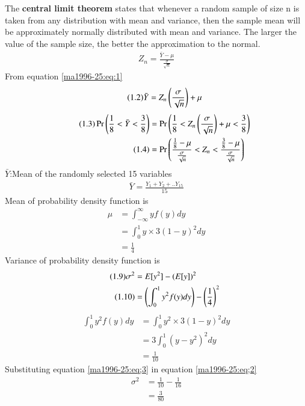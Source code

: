
The \textbf{central limit theorem} states that whenever a random sample of size n is taken from any distribution with mean and variance, then the sample mean will be approximately normally distributed with mean and variance. The larger the value of the sample size, the better the approximation to the normal.
\begin{align}
\tag{1.1}
    Z_{n}=\frac{\bar{Y}-\mu}{\frac{\sigma}{\sqrt{n}}}
    \label{ma1996-25:eq:1}
\end{align}
From equation \ref{ma1996-25:eq:1}
\begin{align}
    \tag{1.2}
    \bar{Y}=Z_{n}\left(\frac{\sigma}{\sqrt{n}}\right)+\mu
\end{align}
\begin{align}
\tag{1.3}
\Pr\left(\frac{1}{8}<\Bar{Y}<\frac{3}{8}\right)
&=\Pr\left(\frac{1}{8}<Z_{n}\left(\frac{\sigma}{\sqrt{n}}\right)+\mu<\frac{3}{8}\right)\\
\tag{1.4}  
&=\Pr\left(\frac{\frac{1}{8}-\mu}{\frac{\sigma}{\sqrt{n}}}<Z_{n}<\frac{\frac{3}{8}-\mu}{\frac{\sigma}{\sqrt{n}}}\right)
\label{ma1996-25:eq;123}
\end{align}
$\bar{Y}$:Mean of the randomly selected 15 variables
\begin{align}
\tag{1.5}
    \bar{Y}=\frac{Y_{1}+Y_{2}+..Y_{15}}{15}
\end{align}
Mean of probability density function is
\begin{align}
\tag{1.6}
\mu&=\int_{-\infty}^{\infty}yf(y)dy\\
\tag{1.7}
    &=\int_{0}^{1}y\times 3(1-y)^{2}dy\\
\tag{1.8}
    &=\frac{1}{4}
\end{align}
Variance of probability density function is
\begin{align}
\tag{1.9}
\sigma^{2}&=E[y^{2}]-(E[y])^{2}\\
\tag{1.10}
\label{ma1996-25:eq;2}
      &=\left(\int_{0}^{1}y^{2}f(y)dy\right) - \left(\frac{1}{4}\right)^{2}
\end{align}
\begin{align}
\tag{1.11}
    \int_{0}^{1}y^{2}f(y)dy &= \int_{0}^{1}y^{2}\times3(1-y)^{2}dy\\
\tag{1.12}
                            &=3\int_{0}^{1}(y-y^{2})^{2}dy\\
\tag{1.13}
\label{ma1996-25:eq;3}
                            &=\frac{1}{10}
\end{align}
Substituting equation \ref{ma1996-25:eq;3} in equation \ref{ma1996-25:eq;2}
\begin{align}
\tag{1.14}
 \sigma^{2}&=\frac{1}{10}-\frac{1}{16}\\
\tag{1.15}
           &=\frac{3}{80}
\end{align}
